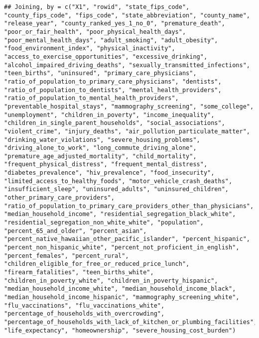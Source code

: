 \documentclass[
]{article}
\newenvironment{Shaded}{\begin{snugshade}}{\end{snugshade}}
\newcommand{\KeywordTok}[1]{\textcolor[rgb]{0.13,0.29,0.53}{\textbf{#1}}}
\newcommand{\NormalTok}[1]{#1}
\newcommand{\OperatorTok}[1]{\textcolor[rgb]{0.81,0.36,0.00}{\textbf{#1}}}
\newcommand{\StringTok}[1]{\textcolor[rgb]{0.31,0.60,0.02}{#1}}
\begin{document}
\begin{verbatim}
## Joining, by = c("X1", "rowid", "state_fips_code", "county_fips_code", "fips_code", "state_abbreviation", "county_name", "release_year", "county_ranked_yes_1_no_0", "premature_death", "poor_or_fair_health", "poor_physical_health_days", "poor_mental_health_days", "adult_smoking", "adult_obesity", "food_environment_index", "physical_inactivity", "access_to_exercise_opportunities", "excessive_drinking", "alcohol_impaired_driving_deaths", "sexually_transmitted_infections", "teen_births", "uninsured", "primary_care_physicians", "ratio_of_population_to_primary_care_physicians", "dentists", "ratio_of_population_to_dentists", "mental_health_providers", "ratio_of_population_to_mental_health_providers", "preventable_hospital_stays", "mammography_screening", "some_college", "unemployment", "children_in_poverty", "income_inequality", "children_in_single_parent_households", "social_associations", "violent_crime", "injury_deaths", "air_pollution_particulate_matter", "drinking_water_violations", "severe_housing_problems", "driving_alone_to_work", "long_commute_driving_alone", "premature_age_adjusted_mortality", "child_mortality", "frequent_physical_distress", "frequent_mental_distress", "diabetes_prevalence", "hiv_prevalence", "food_insecurity", "limited_access_to_healthy_foods", "motor_vehicle_crash_deaths", "insufficient_sleep", "uninsured_adults", "uninsured_children", "other_primary_care_providers", "ratio_of_population_to_primary_care_providers_other_than_physicians", "median_household_income", "residential_segregation_black_white", "residential_segregation_non_white_white", "population", "percent_65_and_older", "percent_asian", "percent_native_hawaiian_other_pacific_islander", "percent_hispanic", "percent_non_hispanic_white", "percent_not_proficient_in_english", "percent_females", "percent_rural", "children_eligible_for_free_or_reduced_price_lunch", "firearm_fatalities", "teen_births_white", "children_in_poverty_white", "children_in_poverty_hispanic", "median_household_income_white", "median_household_income_black", "median_household_income_hispanic", "mammography_screening_white", "flu_vaccinations", "flu_vaccinations_white", "percentage_of_households_with_overcrowding", "percentage_of_households_with_lack_of_kitchen_or_plumbing_facilities", "life_expectancy", "homeownership", "severe_housing_cost_burden")
\end{verbatim}

\begin{Shaded}
\end{Shaded}
\end{document}
